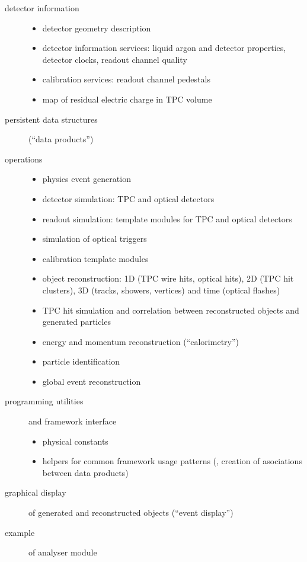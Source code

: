 \begin{description}
	\item[detector information] \mbox{} %
		\begin{itemize}
			\item detector geometry description
			\item detector information services: liquid argon and detector properties, detector clocks, readout channel quality
			\item calibration services: readout channel pedestals
			\item map of residual electric charge in TPC volume
		\end{itemize}
	\item[persistent data structures] (``data products'')
	\item[operations] \mbox{} %
		\begin{itemize}
			\item physics event generation
			\item detector simulation: TPC and optical detectors
			\item readout simulation: template modules for TPC and optical detectors
			\item simulation of optical triggers
			\item calibration template modules
			\item object reconstruction: 1D (TPC wire hits, optical hits), 2D (TPC hit clusters), 3D (tracks, showers, vertices) and time (optical flashes)
			\item TPC hit simulation and correlation between reconstructed objects and generated particles
			\item energy and momentum reconstruction (``calorimetry'')
			\item particle identification
			\item global event reconstruction
		\end{itemize}
	\item[programming utilities] and framework interface
		\begin{itemize}
			\item physical constants
			\item helpers for common framework usage patterns (\eg, creation of asociations between data products)
		\end{itemize}
	\item[graphical display] of generated and reconstructed objects (``event display'')
	\item[example] of analyser module
\end{description}
